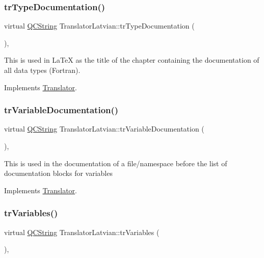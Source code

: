 \subsubsection{\texorpdfstring{trTypeDocumentation()}{trTypeDocumentation()}}
{\footnotesize\ttfamily virtual \mbox{\hyperlink{class_q_c_string}{Q\+C\+String}} Translator\+Latvian\+::tr\+Type\+Documentation (\begin{DoxyParamCaption}{ }\end{DoxyParamCaption})\hspace{0.3cm}{\ttfamily [inline]}, {\ttfamily [virtual]}}

This is used in La\+TeX as the title of the chapter containing the documentation of all data types (Fortran). 

Implements \mbox{\hyperlink{class_translator}{Translator}}.

\mbox{\label{class_translator_latvian_ae10fb8f6a17d0a8a0892ecc421b185fb}} 
\subsubsection{\texorpdfstring{trVariableDocumentation()}{trVariableDocumentation()}}
{\footnotesize\ttfamily virtual \mbox{\hyperlink{class_q_c_string}{Q\+C\+String}} Translator\+Latvian\+::tr\+Variable\+Documentation (\begin{DoxyParamCaption}{ }\end{DoxyParamCaption})\hspace{0.3cm}{\ttfamily [inline]}, {\ttfamily [virtual]}}

This is used in the documentation of a file/namespace before the list of documentation blocks for variables 

Implements \mbox{\hyperlink{class_translator}{Translator}}.

\mbox{\label{class_translator_latvian_a24496bf9a3a964cd9fc88a5b5651729f}} 
\subsubsection{\texorpdfstring{trVariables()}{trVariables()}}
{\footnotesize\ttfamily virtual \mbox{\hyperlink{class_q_c_string}{Q\+C\+String}} Translator\+Latvian\+::tr\+Variables (\begin{DoxyParamCaption}{ }\end{DoxyParamCaption})\hspace{0.3cm}{\ttfamily [inline]}, {\ttfamily [virtual]}}

